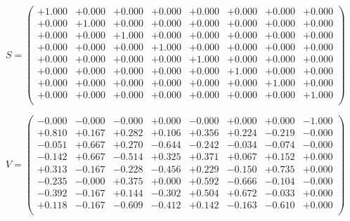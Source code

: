\documentclass[9pt]{article}
\theoremstyle{plain}
\theoremstyle{definition}
\theoremstyle{remark}
\numberwithin{equation}{section}
\begin{document}
$S = \left(
\begin{array}{
cccccccc}
+1.000 & +0.000 & +0.000 & +0.000 & +0.000 & +0.000 & +0.000 & +0.000 \\
+0.000 & +1.000 & +0.000 & +0.000 & +0.000 & +0.000 & +0.000 & +0.000 \\
+0.000 & +0.000 & +1.000 & +0.000 & +0.000 & +0.000 & +0.000 & +0.000 \\
+0.000 & +0.000 & +0.000 & +1.000 & +0.000 & +0.000 & +0.000 & +0.000 \\
+0.000 & +0.000 & +0.000 & +0.000 & +1.000 & +0.000 & +0.000 & +0.000 \\
+0.000 & +0.000 & +0.000 & +0.000 & +0.000 & +1.000 & +0.000 & +0.000 \\
+0.000 & +0.000 & +0.000 & +0.000 & +0.000 & +0.000 & +1.000 & +0.000 \\
+0.000 & +0.000 & +0.000 & +0.000 & +0.000 & +0.000 & +0.000 & +1.000 \\
\end{array}
\right)$ \newline 

$V = \left(
\begin{array}{
cccccccc}
-0.000 & -0.000 & -0.000 & +0.000 & -0.000 & +0.000 & +0.000 & -1.000 \\
+0.810 & +0.167 & +0.282 & +0.106 & +0.356 & +0.224 & -0.219 & -0.000 \\
-0.051 & +0.667 & +0.270 & -0.644 & -0.242 & -0.034 & -0.074 & -0.000 \\
-0.142 & +0.667 & -0.514 & +0.325 & +0.371 & +0.067 & +0.152 & +0.000 \\
+0.313 & -0.167 & -0.228 & -0.456 & +0.229 & -0.150 & +0.735 & +0.000 \\
-0.235 & -0.000 & +0.375 & +0.000 & +0.592 & -0.666 & -0.104 & -0.000 \\
-0.392 & -0.167 & +0.144 & -0.302 & +0.504 & +0.672 & -0.033 & +0.000 \\
+0.118 & -0.167 & -0.609 & -0.412 & +0.142 & -0.163 & -0.610 & +0.000 \\
\end{array}
\right)$ \newline 
\end{document}
